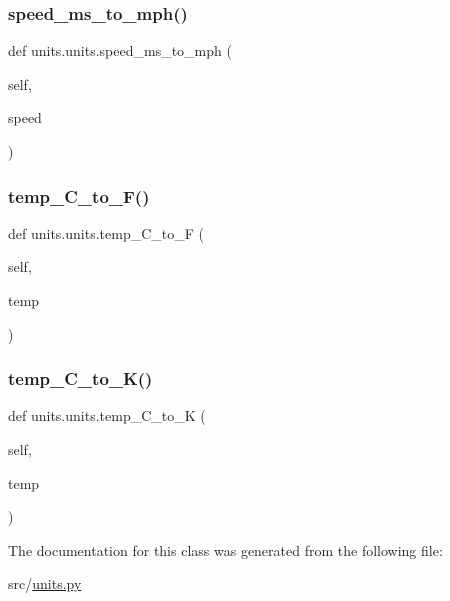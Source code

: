 \mbox{\label{classunits_1_1units_a9ca0a3b531dd6d580a5f50d47250a889}} 
\subsubsection{\texorpdfstring{speed\+\_\+ms\+\_\+to\+\_\+mph()}{speed\_ms\_to\_mph()}}
{\footnotesize\ttfamily def units.\+units.\+speed\+\_\+ms\+\_\+to\+\_\+mph (\begin{DoxyParamCaption}\item[{}]{self,  }\item[{}]{speed }\end{DoxyParamCaption})}

\mbox{\label{classunits_1_1units_a59cb803b7f3f34fec224e047ded48cdb}} 
\subsubsection{\texorpdfstring{temp\+\_\+\+C\+\_\+to\+\_\+\+F()}{temp\_C\_to\_F()}}
{\footnotesize\ttfamily def units.\+units.\+temp\+\_\+\+C\+\_\+to\+\_\+F (\begin{DoxyParamCaption}\item[{}]{self,  }\item[{}]{temp }\end{DoxyParamCaption})}

\mbox{\label{classunits_1_1units_aacbd2271524a124c433305cab790b496}} 
\subsubsection{\texorpdfstring{temp\+\_\+\+C\+\_\+to\+\_\+\+K()}{temp\_C\_to\_K()}}
{\footnotesize\ttfamily def units.\+units.\+temp\+\_\+\+C\+\_\+to\+\_\+K (\begin{DoxyParamCaption}\item[{}]{self,  }\item[{}]{temp }\end{DoxyParamCaption})}



The documentation for this class was generated from the following file\+:\begin{DoxyCompactItemize}
\item 
src/\hyperlink{units_8py}{units.\+py}\end{DoxyCompactItemize}
